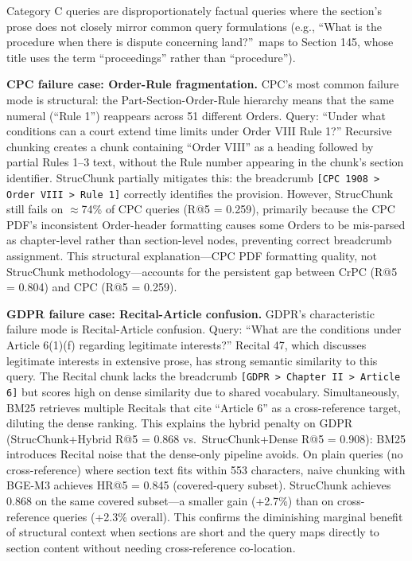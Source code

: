 \documentclass[sn-mathphys,Numbered]{sn-jnl}%
\begin{document}
Category C queries are disproportionately factual queries where the
section's prose does not closely mirror common query formulations
(e.g., ``What is the procedure when there is dispute concerning
land?''\ maps to Section 145, whose title uses the term
``proceedings'' rather than ``procedure'').

\textbf{CPC failure case: Order-Rule fragmentation.}  CPC's most common
failure mode is structural: the Part-Section-Order-Rule hierarchy means
that the same numeral (``Rule 1'') reappears across 51 different Orders.
Query: ``Under what conditions can a court extend time limits under Order
VIII Rule 1?''  Recursive chunking creates a chunk containing ``Order
VIII'' as a heading followed by partial Rules 1--3 text, without the Rule
number appearing in the chunk's section identifier.  StrucChunk partially
mitigates this: the breadcrumb \texttt{[CPC 1908 > Order VIII > Rule 1]}
correctly identifies the provision.  However, StrucChunk still fails on
$\approx$74\% of CPC queries (R@5 = 0.259), primarily because the CPC
PDF's inconsistent Order-header formatting causes some Orders to be
mis-parsed as chapter-level rather than section-level nodes, preventing
correct breadcrumb assignment.  This structural explanation---CPC PDF
formatting quality, not StrucChunk methodology---accounts for the
persistent gap between CrPC (R@5 = 0.804) and CPC (R@5 = 0.259).

\textbf{GDPR failure case: Recital-Article confusion.}  GDPR's
characteristic failure mode is Recital-Article confusion.  Query:
``What are the conditions under Article 6(1)(f) regarding legitimate
interests?''  Recital 47, which discusses legitimate interests in
extensive prose, has strong semantic similarity to this query.  The
Recital chunk lacks the breadcrumb \texttt{[GDPR > Chapter II > Article
6]} but scores high on dense similarity due to shared vocabulary.
Simultaneously, BM25 retrieves multiple Recitals that cite ``Article 6''
as a cross-reference target, diluting the dense ranking.  This explains
the hybrid penalty on GDPR (StrucChunk+Hybrid R@5 = 0.868 vs.\
StrucChunk+Dense R@5 = 0.908): BM25 introduces Recital noise that the
dense-only pipeline avoids.  On plain queries (no
cross-reference) where section text fits within 553 characters, naive
chunking with BGE-M3 achieves HR@5 = 0.845 (covered-query subset).
StrucChunk achieves 0.868 on the same covered subset---a smaller gain
(+2.7\%) than on cross-reference queries (+2.3\% overall).  This confirms
the diminishing marginal benefit of structural context when sections are
short and the query maps directly to section content without needing
cross-reference co-location.
\end{document}
